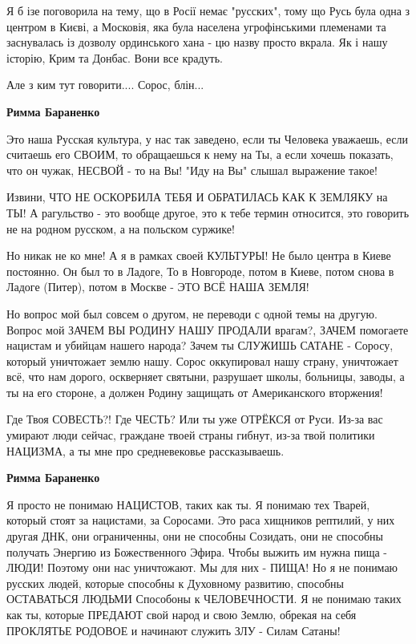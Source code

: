 \begin{itemize}
\begin{itemize}
Я б ізе поговорила на тему, що в Росії немає "русских", тому що Русь була одна
з центром в Києві, а Московія, яка була населена угрофінськими племенами та
заснувалась із дозволу ординського хана - цю назву просто вкрала. Як і нашу
історію, Крим та Донбас. Вони все крадуть.

Але з ким тут говорити.... Сорос, блін...



\textbf{Римма Бараненко} 

Это наша Русская культура, у нас так заведено, если ты Человека уважаешь, если
считаешь его СВОИМ, то обращаешься к нему на Ты, а если хочешь показать, что он
чужак, НЕСВОЙ - то на Вы! "Иду на Вы" слышал выражение такое! 

Извини, ЧТО НЕ ОСКОРБИЛА ТЕБЯ И ОБРАТИЛАСЬ КАК К ЗЕМЛЯКУ на ТЫ! А рагульство -
это вообще другое, это к тебе термин относится, это говорить не на родном
русском, а на польском суржике! 

Но никак не ко мне! А я в рамках своей КУЛЬТУРЫ! Не было центра в Киеве постоянно. Он был то в Ладоге, То в Новгороде, потом в Киеве, потом снова в Ладоге (Питер), потом в Москве - ЭТО ВСЁ НАША ЗЕМЛЯ! 

Но вопрос мой был совсем о другом, не переводи с одной темы на другую. Вопрос
мой ЗАЧЕМ ВЫ РОДИНУ НАШУ ПРОДАЛИ врагам?, ЗАЧЕМ помогаете нацистам и убийцам
нашего народа? Зачем ты СЛУЖИШЬ САТАНЕ - Соросу, который уничтожает землю нашу.
Сорос оккупировал нашу страну, уничтожает всё, что нам дорого, оскверняет
святыни, разрушает школы, больницы, заводы, а ты на его стороне, а должен
Родину защищать от Американского вторжения! 

Где Твоя СОВЕСТЬ?! Где ЧЕСТЬ? Или ты уже ОТРЁКСЯ от Руси. Из-за вас умирают
люди сейчас, граждане твоей страны гибнут, из-за твой политики НАЦИЗМА, а ты
мне про средневековье рассказываешь.


\textbf{Римма Бараненко} 

Я просто не понимаю НАЦИСТОВ, таких как ты. Я понимаю тех Тварей, который стоят
за нацистами, за Соросами. Это раса хищников рептилий, у них другая ДНК, они
ограниченны, они не способны Созидать, они не способны получать Энергию из
Божественного Эфира. Чтобы выжить им нужна пища - ЛЮДИ! Поэтому они нас
уничтожают. Мы для них - ПИЩА! Но я не понимаю русских людей, которые способны к
Духовному развитию, способны ОСТАВАТЬСЯ ЛЮДЬМИ Способоны к ЧЕЛОВЕЧНОСТИ. Я не
понимаю таких как ты, которые ПРЕДАЮТ свой народ и свою Землю, обрекая на себя
ПРОКЛЯТЬЕ РОДОВОЕ и начинают служить ЗЛУ - Силам Сатаны! 


\end{itemize}
\end{itemize}
